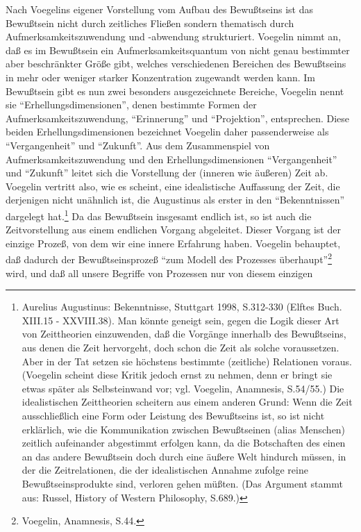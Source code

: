 Nach Voegelins eigener Vorstellung vom Aufbau des Bewußtseins ist das
Bewußtsein nicht durch zeitliches Fließen sondern thematisch durch
Aufmerksamkeitszuwendung und -abwendung strukturiert. Voegelin nimmt an,
daß es im Bewußtsein ein Aufmerksamkeitsquantum von nicht genau
bestimmter aber beschränkter Größe gibt, welches verschiedenen Bereichen
des Bewußtseins in mehr oder weniger starker Konzentration zugewandt
werden kann. Im Bewußtsein gibt es nun zwei besonders ausgezeichnete
Bereiche, Voegelin nennt sie "`Erhellungsdimensionen"', denen bestimmte
Formen der Aufmerksamkeitszuwendung, "`Erinnerung"' und "`Projektion"',
entsprechen.  Diese beiden Erhellungsdimensionen bezeichnet Voegelin
daher passenderweise als "`Vergangenheit"' und "`Zukunft"'. Aus dem
Zusammenspiel von Aufmerksamkeitszuwendung und den Erhellungsdimensionen
"`Vergangenheit"' und "`Zukunft"' leitet sich die Vorstellung der
(inneren wie äußeren) Zeit ab.  Voegelin vertritt also, wie es scheint,
eine idealistische Auffassung der Zeit, die derjenigen nicht unähnlich
ist, die Augustinus als erster in den "`Bekenntnissen"' dargelegt
hat.\footnote{Aurelius Augustinus: Bekenntnisse, Stuttgart 1998,
  S.312-330 (Elftes Buch. XIII.15 - XXVIII.38). Man könnte geneigt sein,
  gegen die Logik dieser Art von Zeittheorien einzuwenden, daß die
  Vorgänge innerhalb des Bewußtseins, aus denen die Zeit hervorgeht,
  doch schon die Zeit als solche voraussetzen. Aber in der Tat setzen
  sie höchstens bestimmte (zeitliche) Relationen voraus.  (Voegelin
  scheint diese Kritik jedoch ernst zu nehmen, denn er bringt sie etwas
  später als Selbsteinwand vor; vgl. Voegelin, Anamnesis, S.54/55.) Die
  idealistischen Zeittheorien scheitern aus einem anderen Grund: Wenn
  die Zeit ausschließlich eine Form oder Leistung des Bewußtseins ist,
  so ist nicht erklärlich, wie die Kommunikation zwischen Bewußtseinen
  (alias Menschen) zeitlich aufeinander abgestimmt erfolgen kann, da die
  Botschaften des einen an das andere Bewußtsein doch durch eine äußere
  Welt hindurch müssen, in der die Zeitrelationen, die der
  idealistischen Annahme zufolge reine Bewußtseinsprodukte sind,
  verloren gehen müßten. (Das Argument stammt aus: Russel, History of
  Western Philosophy, S.689.)} Da das Bewußtsein insgesamt endlich ist,
so ist auch die Zeitvorstellung aus einem endlichen Vorgang abgeleitet.
Dieser Vorgang ist der einzige Prozeß, von dem wir eine innere Erfahrung
haben. Voegelin behauptet, daß dadurch der Bewußtseinsprozeß "`zum
Modell des Prozesses überhaupt"'\footnote{Voegelin, Anamnesis, S.44.}
wird, und daß all unsere Begriffe von Prozessen nur von diesem einzigen
